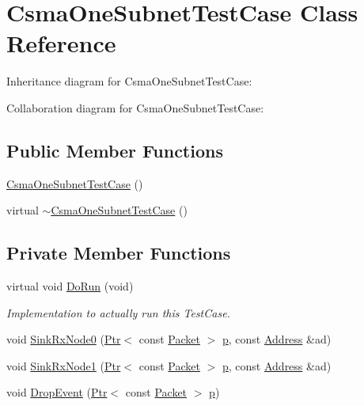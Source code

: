 \hypertarget{classCsmaOneSubnetTestCase}{}\section{Csma\+One\+Subnet\+Test\+Case Class Reference}
\label{classCsmaOneSubnetTestCase}


Inheritance diagram for Csma\+One\+Subnet\+Test\+Case\+:


Collaboration diagram for Csma\+One\+Subnet\+Test\+Case\+:
\subsection*{Public Member Functions}
\begin{DoxyCompactItemize}
\item 
\hyperlink{classCsmaOneSubnetTestCase_a57a9d06985424c8beaf5a7aba2275339}{Csma\+One\+Subnet\+Test\+Case} ()
\item 
virtual \hyperlink{classCsmaOneSubnetTestCase_abd2ccf978fa73235f30167838dab1020}{$\sim$\+Csma\+One\+Subnet\+Test\+Case} ()
\end{DoxyCompactItemize}
\subsection*{Private Member Functions}
\begin{DoxyCompactItemize}
\item 
virtual void \hyperlink{classCsmaOneSubnetTestCase_a801e886faf2701f211892bb32df83cb1}{Do\+Run} (void)
\begin{DoxyCompactList}\small\item\em Implementation to actually run this Test\+Case. \end{DoxyCompactList}\item 
void \hyperlink{classCsmaOneSubnetTestCase_a53b1e43c6c1979c70ba4ef11d37a2e13}{Sink\+Rx\+Node0} (\hyperlink{classns3_1_1Ptr}{Ptr}$<$ const \hyperlink{classns3_1_1Packet}{Packet} $>$ \hyperlink{lte__link__budget__x2__handover__measures_8m_ac9de518908a968428863f829398a4e62}{p}, const \hyperlink{classns3_1_1Address}{Address} \&ad)
\item 
void \hyperlink{classCsmaOneSubnetTestCase_a92e626399f8a6fa4171b247d7c37dc61}{Sink\+Rx\+Node1} (\hyperlink{classns3_1_1Ptr}{Ptr}$<$ const \hyperlink{classns3_1_1Packet}{Packet} $>$ \hyperlink{lte__link__budget__x2__handover__measures_8m_ac9de518908a968428863f829398a4e62}{p}, const \hyperlink{classns3_1_1Address}{Address} \&ad)
\item 
void \hyperlink{classCsmaOneSubnetTestCase_a9ba9b2f1f9e7e97994175e24aedfd124}{Drop\+Event} (\hyperlink{classns3_1_1Ptr}{Ptr}$<$ const \hyperlink{classns3_1_1Packet}{Packet} $>$ \hyperlink{lte__link__budget__x2__handover__measures_8m_ac9de518908a968428863f829398a4e62}{p})
\end{DoxyCompactItemize}
